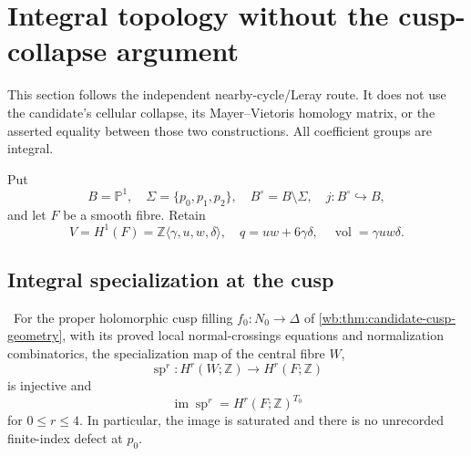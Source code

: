 \section{Integral topology without the cusp-collapse argument}
\label{mapsI:top:sec:integral-leray}

This section follows the independent nearby-cycle/Leray route.  It does not
use the candidate's cellular collapse, its Mayer--Vietoris homology matrix,
or the asserted equality between those two constructions.  All coefficient
groups are integral.

Put
\[
 B=\mathbb P^1,\quad \Sigma=\{p_0,p_1,p_2\},\quad
 B^\circ=B\setminus\Sigma,\quad j:B^\circ\hookrightarrow B,
\]
and let \(F\) be a smooth fibre.  Retain
\[
 V=H^1(F)=\mathbb Z\langle\gamma,u,w,\delta\rangle,
 \quad q=uw+6\gamma\delta,
 \quad \operatorname{vol}=\gamma uw\delta.
\]

\subsection{Integral specialization at the cusp}

\begin{theorem}
\label{mapsI:top:thm:p0-integral-specialization}
\ For the proper holomorphic cusp filling
\(f_0:N_0\to\Delta\) of \cref{wb:thm:candidate-cusp-geometry}, with its
proved local normal-crossings equations and normalization combinatorics,
the specialization map of the central fibre \(W\),
\[
 \operatorname{sp}^r:H^r(W;\mathbb Z)\longrightarrow H^r(F;\mathbb Z)
\]
is injective and
\[
 \operatorname{im}\operatorname{sp}^r
 =H^r(F;\mathbb Z)^{T_0}
\tag{IL.5.1}
\]
for \(0\le r\le4\).  In particular, the image is saturated and there is no
unrecorded finite-index defect at \(p_0\).
\end{theorem}

